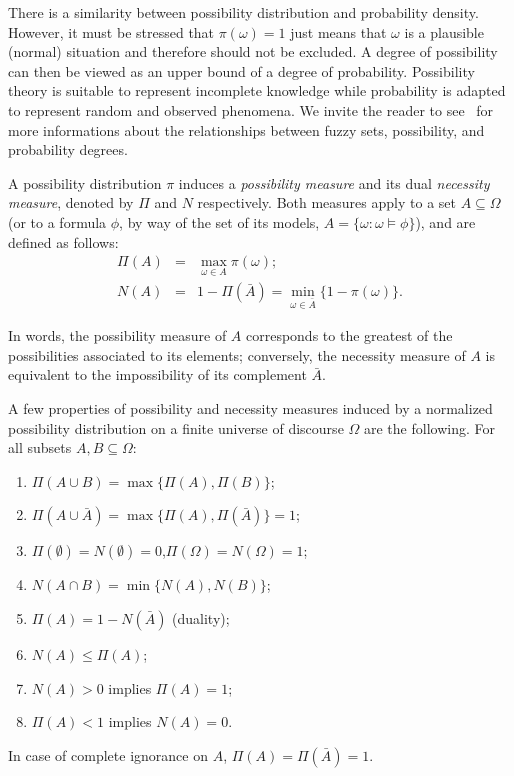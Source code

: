 \documentclass{llncs}
\begin{document}
There is a similarity between possibility distribution and probability 
density. However, it must be stressed that $\pi(\omega) = 1$ just means that
$\omega$ is a plausible (normal) situation and therefore should not be excluded.
A degree of possibility can then be viewed as an upper bound of a degree of probability.
Possibility theory is suitable to represent incomplete knowledge while 
probability is adapted to represent random and observed phenomena. 
We invite the reader to see~\cite{dubois1991} for more informations
about the relationships between fuzzy sets, possibility, and probability 
degrees.

A possibility distribution $\pi$ induces a \emph{possibility
measure} and its dual \emph{necessity
measure}, denoted by $\Pi$ and $N$
respectively. Both measures apply to a set $A \subseteq\Omega$ (or to a
formula $\phi$, by way of the set of its models, $A = \{\omega : \omega \models \phi\}$),
and are defined as follows:
\begin{eqnarray}
  \Pi(A) &=& \max_{\omega\in A} \pi(\omega); \\
  N(A)   &=& 1 - \Pi(\bar{A}) = \min_{\omega\in \bar{A}} \{1 - \pi(\omega)\}.
\end{eqnarray}

In words, the possibility measure of $A$ corresponds to the
greatest of the possibilities associated to its elements; conversely,
the necessity measure of $A$ is equivalent to the impossibility of
its complement $\bar{A}$.

A few properties of possibility and necessity measures 
induced by a normalized possibility distribution on a finite universe of
discourse $\Omega$ are the following. For all subsets $A, B\subseteq \Omega$:
\begin{enumerate}
  \item $\Pi(A \cup B) = \max\{\Pi(A), \Pi(B)\}$;
  \item $\Pi(A \cup \bar A) = \max\{\Pi(A), \Pi(\bar A)\}=1$;
  \item $\Pi(\emptyset) = N(\emptyset) = 0$,\quad $\Pi(\Omega) = N(\Omega) = 1$;
  \item $N(A \cap B) = \min\{N(A), N(B)\}$;
  \item $\Pi(A) = 1 - N(\bar{A})$ (duality);
  \item $N(A) \leq \Pi(A)$;
  \item $N(A) > 0$ implies $\Pi(A) = 1$;
  \item $\Pi(A) < 1$ implies $N(A) = 0$.
\end{enumerate}
In case of complete ignorance on $A$, $\Pi(A) = \Pi(\bar{A}) = 1$.
\end{document}

